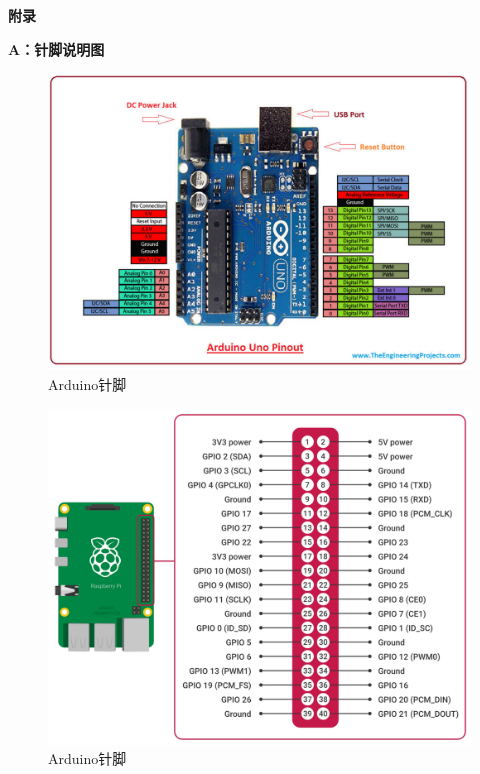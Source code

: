 \documentclass[UTF8,14pt]{article}
\newcommand\sectionone[1]{\centerline{\Large{\bfseries{#1}}}}
\newcommand\sectiontwo[1]{\centerline{\large{\bfseries{#1}}}}
\begin{document}
\clearpage
\sectionone{附录}
\sectiontwo{A：针脚说明图}
\begin{figure}[!h]
	\centering
	\vspace{-10pt}
	\includegraphics[width=15cm]{figures/arduino-uno.pdf}
	\vspace{-15pt}
	\caption{Arduino针脚}
\end{figure}

\begin{figure}[!h]
	\centering
	\includegraphics[width=15cm]{figures/Raspberry-Pinout.pdf}
	\vspace{-10pt}
	\caption{Arduino针脚}
\end{figure}
\end{document}
